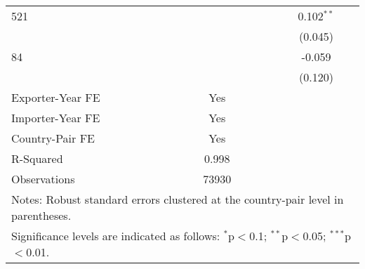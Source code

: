 \begin{longtable}{lccc}
    521 &  &  & 0.102$^{\ast\ast}$ \\
    &  &  & (0.045) \\
    84  &  &  & -0.059 \\
    &  &  & (0.120) \\
    \hline
    Exporter-Year FE & Yes \\
    Importer-Year FE & Yes \\
    Country-Pair FE & Yes \\
    R-Squared & 0.998 \\
    Observations & 73930 \\
    \hline
    \multicolumn{4}{l}{\footnotesize{Notes: Robust standard errors clustered at the country-pair level in parentheses.}} \\
    \multicolumn{4}{l}{\footnotesize{Significance levels are indicated as follows: $^{\ast}$p$<$0.1; $^{\ast\ast}$p$<$0.05; $^{\ast\ast\ast}$p$<$0.01.}} \\
\end{longtable}

